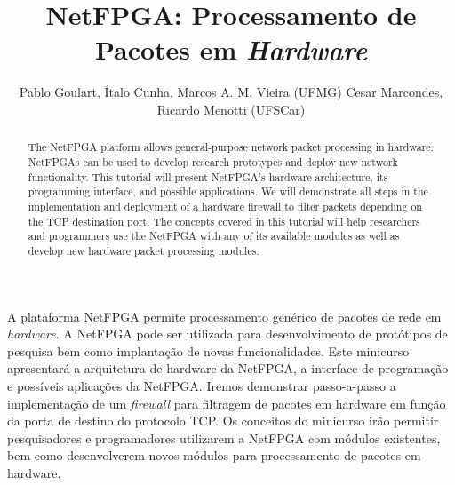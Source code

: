 \documentclass{SBCbookchapter}
\author{\vspace{2mm}Pablo Goulart, Ítalo Cunha, Marcos A. M. Vieira (UFMG)\newline
Cesar Marcondes, Ricardo Menotti (UFSCar)}
\title{NetFPGA: Processamento de Pacotes em \emph{Hardware}}
\begin{document}
\maketitle


\begin{abstract}

The NetFPGA platform allows general-purpose network packet processing in hardware. NetFPGAs can be used to develop research prototypes and deploy new network functionality. This tutorial will present NetFPGA's hardware architecture, its programming interface, and possible applications. We will demonstrate all steps in the implementation and deployment of a hardware firewall to filter packets depending on the TCP destination port.  The concepts covered in this tutorial will help researchers and programmers use the NetFPGA with any of its available modules as well as develop new hardware packet processing modules.

\end{abstract}


\begin{resumo}

A plataforma NetFPGA permite processamento genérico de pacotes de rede
em \emph{hardware}. A NetFPGA pode ser utilizada para desenvolvimento de
protótipos de pesquisa bem como implantação de novas funcionalidades.
Este minicurso apresentará a arquitetura de hardware da NetFPGA, a
interface de programação e possíveis aplicações da NetFPGA. Iremos
demonstrar passo-a-passo a implementação de um \emph{firewall} para
filtragem de pacotes em hardware em função da porta de destino do
protocolo TCP.  Os conceitos do minicurso irão permitir pesquisadores e
programadores utilizarem a NetFPGA com módulos existentes, bem como
desenvolverem novos módulos para processamento de pacotes em hardware.

\end{resumo}
















\newpage


\end{document}
